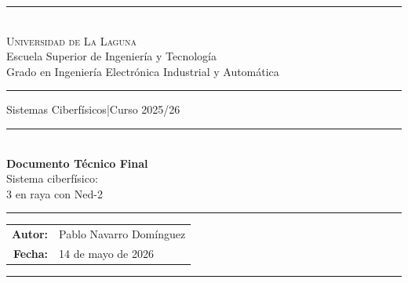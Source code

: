 \documentclass[12pt,a4paper]{article}
\begin{document}
\begin{titlepage}
\centering

{\color{ullblue}\rule{\linewidth}{1.5pt}}\\[0.4cm]
{\large\scshape Universidad de La Laguna}\\[0.15cm]
{\normalsize Escuela Superior de Ingenier\'ia y Tecnolog\'ia}\\[0.15cm]
{\normalsize Grado en Ingenier\'ia Electr\'onica Industrial y Autom\'atica}\\[0.3cm]
{\color{ullblue}\rule{\linewidth}{0.6pt}}

\vspace{2cm}

{\large Sistemas Ciberf\'isicos\quad|\quad Curso 2025/26}

\vspace{2cm}

{\color{ullblue}\rule{0.6\linewidth}{0.4pt}}\\[0.6cm]
{\LARGE\bfseries Documento T\'ecnico Final}\\[0.5cm]
{\Large Sistema ciberf\'isico:\\[0.2cm] 3 en raya con Ned-2}\\[0.6cm]
{\color{ullblue}\rule{0.6\linewidth}{0.4pt}}

\vfill

\begin{tabular}{rl}
  \textbf{Autor:}  & Pablo Navarro Dom\'inguez \\
  \textbf{Fecha:}  & 14 de mayo de 2026 \\
\end{tabular}

\vspace{1.2cm}
{\color{ullblue}\rule{\linewidth}{1.5pt}}

\end{titlepage}

\tableofcontents
\newpage
\end{document}
